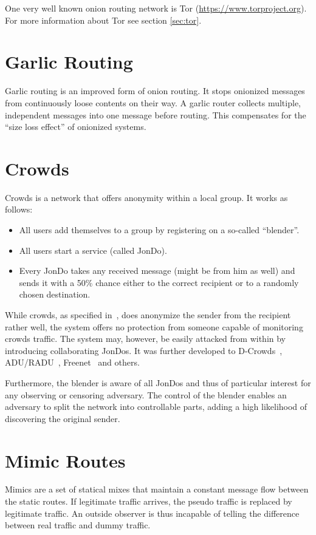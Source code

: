 One very well known onion routing network is Tor (\href{https://www.torproject.org}{https://www.torproject.org}). For more information about Tor see section \ref{sec:tor}.

\section{Garlic Routing}
Garlic routing is an improved form of onion routing. It stops onionized messages from continuously loose contents on their way. A garlic router collects multiple, independent messages into one message before routing. This compensates for the ``size loss effect'' of onionized systems.

\section{Crowds}
Crowds is a network that offers anonymity within a local group. It works as follows:

\begin{itemize}
	\item All users add themselves to a group by registering on a so-called ``blender''.
	\item All users start a service (called JonDo).
	\item Every JonDo takes any received message (might be from him as well) and sends it with a 50\% chance either to the correct recipient or to a randomly chosen destination.
\end{itemize}

While crowds, as specified in~\cite{crowds:tissec}, does anonymize the sender from the recipient rather well, the system offers no protection from someone capable of monitoring crowds traffic. The system may, however, be easily attacked from within by introducing collaborating JonDos. It was further developed to D-Crowds~\cite{crowdsAttack}, ADU/RADU~\cite{Munoz-Gea2008}, Freenet~\cite{freenet} and others. 

Furthermore, the blender is aware of all JonDos and thus of particular interest for any observing or censoring adversary. The control of the blender enables an adversary to split the network into controllable parts, adding a high likelihood of discovering the original sender.

\section{Mimic Routes}
Mimics are a set of statical mixes that maintain a constant message flow between the static routes. If legitimate traffic arrives, the pseudo traffic is replaced by legitimate traffic. An outside observer is thus incapable of telling the difference between real traffic and dummy traffic.

